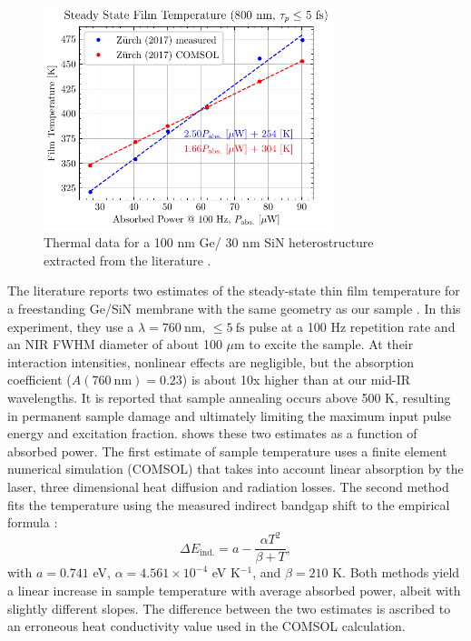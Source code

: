 \begin{figure}
	\centering
	\includegraphics[width=0.75\textwidth]{figures/chap4/COMSOL_temp_power.pdf}
	\caption{Thermal data for a 100 nm Ge/ 30 nm SiN heterostructure extracted from the literature \cite{zurchDirectSimultaneousObservation2017}.}
	\label{fig:COMSOL_temp_power}
\end{figure}

The literature reports two estimates of the steady-state thin film temperature for a freestanding Ge/SiN membrane with the same geometry as our sample \cite{zurchDirectSimultaneousObservation2017}. In this experiment, they use a $\lambda=760 \ \textrm{nm,}$ $\le5 \ \textrm{fs}$ pulse at a 100 Hz repetition rate and an NIR FWHM diameter of about 100 $\mu$m to excite the sample. At their interaction intensities, nonlinear effects are negligible, but the absorption coefficient ($A (760 \ \textrm{nm}) = 0.23$) is about 10x higher than at our mid-IR wavelengths. It is reported that sample annealing occurs above 500 K, resulting in permanent sample damage and ultimately limiting the maximum input pulse energy and excitation fraction.  shows these two estimates as a function of absorbed power. The first estimate of sample temperature uses a finite element numerical simulation (COMSOL) that takes into account linear absorption by the laser, three dimensional heat diffusion and radiation losses. The second method fits the temperature using the measured indirect bandgap shift to the empirical formula \cite{vinaTemperatureDependenceDielectric1984}:
\begin{equation}
\Delta E_{\textrm{ind.}} = a - \frac{\alpha T^2}{\beta + T},
\label{eqn:CB_shift_temp}
\end{equation}
with $a = 0.741$ eV, $\alpha=4.561 \times 10^{-4}$ eV K$^{-1}$, and $\beta = 210$ K. Both methods yield a linear increase in sample temperature with average absorbed power, albeit with slightly different slopes. The difference between the two estimates is ascribed to an erroneous heat conductivity value used in the COMSOL calculation.

